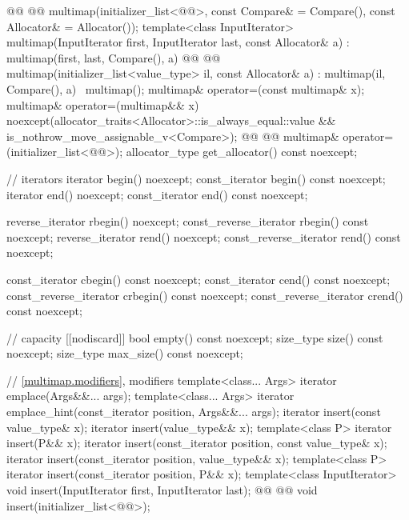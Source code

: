 \documentclass{wg21}
\begin{document}
\begin{codeblock}
{{    @@
    @@
    multimap(initializer_list<@@>,
        const Compare& = Compare(),
        const Allocator& = Allocator());
    template<class InputIterator>
    multimap(InputIterator first, InputIterator last, const Allocator& a)
    : multimap(first, last, Compare(), a) { }
    @@
    @@
    multimap(initializer_list<value_type> il, const Allocator& a)
    : multimap(il, Compare(), a) { }
    ~multimap();
    multimap& operator=(const multimap& x);
    multimap& operator=(multimap&& x)
    noexcept(allocator_traits<Allocator>::is_always_equal::value &&
    is_nothrow_move_assignable_v<Compare>);
    @@
    @@
    multimap& operator=(initializer_list<@@>);
    allocator_type get_allocator() const noexcept;
    
    // iterators
    iterator               begin() noexcept;
    const_iterator         begin() const noexcept;
    iterator               end() noexcept;
    const_iterator         end() const noexcept;
    
    reverse_iterator       rbegin() noexcept;
    const_reverse_iterator rbegin() const noexcept;
    reverse_iterator       rend() noexcept;
    const_reverse_iterator rend() const noexcept;
    
    const_iterator         cbegin() const noexcept;
    const_iterator         cend() const noexcept;
    const_reverse_iterator crbegin() const noexcept;
    const_reverse_iterator crend() const noexcept;
    
    // capacity
    [[nodiscard]] bool empty() const noexcept;
    size_type size() const noexcept;
    size_type max_size() const noexcept;
    
    // \ref{multimap.modifiers}, modifiers
    template<class... Args> iterator emplace(Args&&... args);
    template<class... Args> iterator emplace_hint(const_iterator position, Args&&... args);
    iterator insert(const value_type& x);
    iterator insert(value_type&& x);
    template<class P> iterator insert(P&& x);
    iterator insert(const_iterator position, const value_type& x);
    iterator insert(const_iterator position, value_type&& x);
    template<class P> iterator insert(const_iterator position, P&& x);
    template<class InputIterator>
    void insert(InputIterator first, InputIterator last);
    @@
    @@
    void insert(initializer_list<@@>);
    
}}
\end{codeblock}
\end{document}
